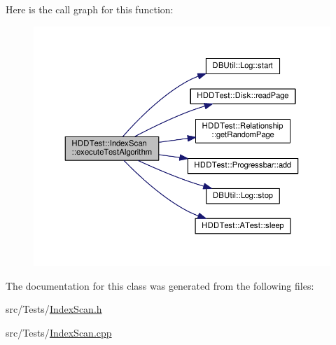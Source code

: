 Here is the call graph for this function\-:
\nopagebreak
\begin{figure}[H]
\begin{center}
\leavevmode
\includegraphics[width=350pt]{class_h_d_d_test_1_1_index_scan_a63c295ffb3dd74515cf6c6583c9dc462_cgraph}
\end{center}
\end{figure}




The documentation for this class was generated from the following files\-:\begin{DoxyCompactItemize}
\item 
src/\-Tests/\hyperlink{_index_scan_8h}{Index\-Scan.\-h}\item 
src/\-Tests/\hyperlink{_index_scan_8cpp}{Index\-Scan.\-cpp}\end{DoxyCompactItemize}
